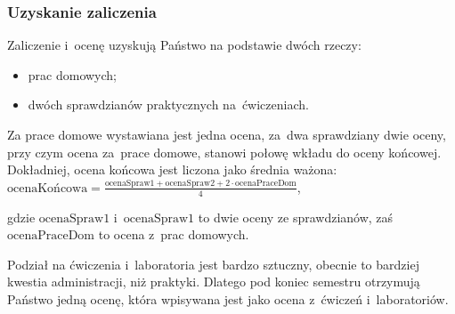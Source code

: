 \documentclass[10pt,t]{beamer}
\begin{document}
\begin{frame}
  \frametitle{Uzyskanie zaliczenia}


  Zaliczenie i~ocenę uzyskują Państwo na podstawie dwóch rzeczy:

  \vspace{-0.3em}



  \begin{itemize}

  \item prac domowych;

  \item dwóch sprawdzianów praktycznych na~ćwiczeniach.

  \end{itemize}

  \vspace{-0.3em}


  Za prace domowe wystawiana jest jedna ocena, za~dwa sprawdziany
  dwie oceny, przy czym ocena za~prace domowe, stanowi
  \alert{połowę} wkładu do oceny końcowej. Dokładniej, ocena końcowa
  jest liczona jako średnia ważona: \\[0.3em]
  $\displaystyle
  \text{ocenaKońcowa} =
  \frac{ \text{ocenaSpraw1} + \text{ocenaSpraw2} +
    2 \cdot \text{ocenaPraceDom} }{ 4 }$,

  \vspace{0.5em}


  gdzie $\text{ocenaSpraw1}$ i~$\text{ocenaSpraw1}$ to dwie oceny ze
  sprawdzianów, zaś $\text{ocenaPraceDom}$ to ocena z~prac domowych.


  Podział na ćwiczenia i~laboratoria jest bardzo sztuczny, obecnie
  to bardziej kwestia administracji, niż praktyki. Dlatego pod koniec
  semestru otrzymują Państwo \alert{jedną} ocenę, która
  wpisywana jest jako ocena z~ćwiczeń i~laboratoriów.

\end{frame}
\end{document}
